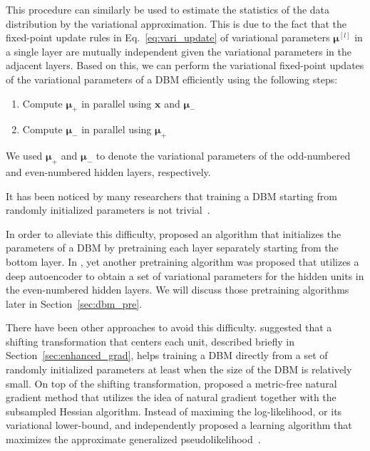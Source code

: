 \documentclass{now}
\newcommand{\qlay}[1]{\left[#1\right]}
\newcommand{\vect}[1]{\mathbf{#1}}
\newcommand{\vects}[1]{\boldsymbol{#1}}
\newcommand{\vx}[0]{\vect{x}}
\newcommand{\vmu}[0]{\vects{\mu}}
\begin{document}
This procedure can similarly be used to estimate the statistics of the data
distribution by the variational approximation. This is due to the fact that the
fixed-point update rules in Eq.~\eqref{eq:vari_update} of variational parameters
$\vmu^{\qlay{l}}$ in a single layer are mutually independent given the
variational parameters in the adjacent layers. Based on this, we can perform the
variational fixed-point updates of the variational parameters of a DBM
efficiently using the following steps:
\begin{enumerate}
    \itemsep 0em
    \item Compute $\vmu_+$ in parallel using $\vx$ and $\vmu_-$
    \item Compute $\vmu_-$ in parallel using $\vmu_+$
\end{enumerate}
We used $\vmu_+$ and $\vmu_-$ to denote the variational parameters of the
odd-numbered and even-numbered hidden layers, respectively.

It has been noticed by many researchers that training a DBM starting from
randomly initialized parameters is not
trivial~\citep{Salakhutdinov2009a,Desjardins2012,Cho13IJCNN,Cho13ICANN}. 

In order to alleviate this difficulty,
\citet{Salakhutdinov2009a,Salakhutdinov2012} proposed an algorithm that
initializes the parameters of a DBM by pretraining each layer separately
starting from the bottom layer. In \citep{Cho13ICANN}, yet another pretraining
algorithm was proposed that utilizes a deep autoencoder to obtain a set of
variational parameters for the hidden units in the even-numbered hidden layers.
We will discuss those pretraining algorithms later in Section~\ref{sec:dbm_pre}.

There have been other approaches to avoid this difficulty.  \citet{Montavon2012}
suggested that a shifting transformation that centers each unit, described
briefly in Section~\ref{sec:enhanced_grad}, helps training a DBM directly from a
set of randomly initialized parameters at least when the size of the DBM is
relatively small.  On top of the shifting transformation, \citet{Desjardins2013}
proposed a metric-free natural gradient method that utilizes the idea of natural
gradient together with the subsampled Hessian algorithm. Instead of maximing the
log-likelihood, or its variational lower-bound, \citet{Goodfellow2013a} and
\citet{Brakel2013} independently proposed a learning algorithm that maximizes
the approximate generalized pseudolikelihood~\citep{Huang2002}. 
\end{document}
